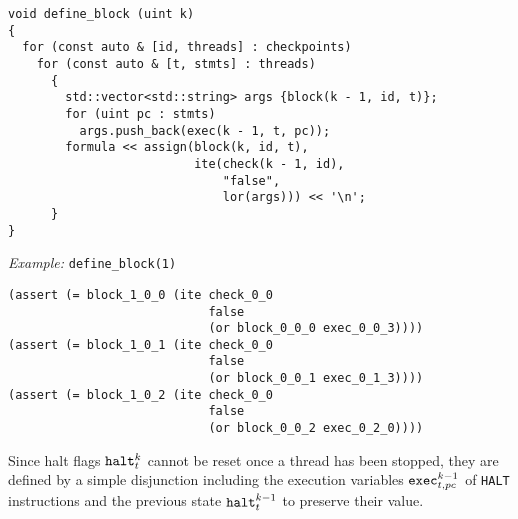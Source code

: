 \begin{lstlisting}[style=c++]
void define_block (uint k)
{
  for (const auto & [id, threads] : checkpoints)
    for (const auto & [t, stmts] : threads)
      {
        std::vector<std::string> args {block(k - 1, id, t)};
        for (uint pc : stmts)
          args.push_back(exec(k - 1, t, pc));
        formula << assign(block(k, id, t),
                          ite(check(k - 1, id),
                              "false",
                              lor(args))) << '\n';
      }
}
\end{lstlisting}

\noindent
\emph{Example:} \lstinline[style=c++]{define_block(1)}

\begin{lstlisting}[language=smtlib]
(assert (= block_1_0_0 (ite check_0_0
                            false
                            (or block_0_0_0 exec_0_0_3))))
(assert (= block_1_0_1 (ite check_0_0
                            false
                            (or block_0_0_1 exec_0_1_3))))
(assert (= block_1_0_2 (ite check_0_0
                            false
                            (or block_0_0_2 exec_0_2_0))))
\end{lstlisting}



\newpage

\noindent
Since halt flags $\texttt{halt}^k_t$ cannot be reset once a thread has been stopped, they are defined by a simple disjunction including the execution variables $\texttt{exec}^{k - 1}_{t, pc}$ of \lstinline[language={[concubine]Assembler}]{HALT} instructions and the previous state $\texttt{halt}^{k - 1}_t$ to preserve their value.

